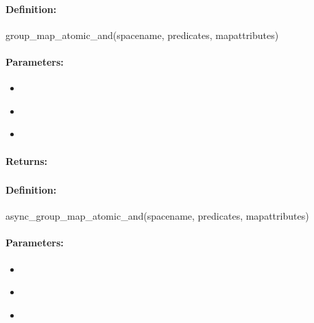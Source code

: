 \paragraph{Definition:}
\begin{rubycode}
group_map_atomic_and(spacename, predicates, mapattributes)
\end{rubycode}

\paragraph{Parameters:}
\begin{itemize}[noitemsep]
\item {}\\

\item {}\\

\item {}\\

\end{itemize}

\paragraph{Returns:}


\pagebreak
\subsubsection{}
\label{api:ruby:async_group_map_atomic_and}


\paragraph{Definition:}
\begin{rubycode}
async_group_map_atomic_and(spacename, predicates, mapattributes)
\end{rubycode}

\paragraph{Parameters:}
\begin{itemize}[noitemsep]
\item {}\\

\item {}\\

\item {}\\

\end{itemize}

